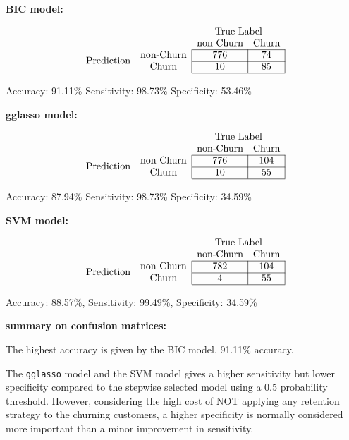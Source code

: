 \documentclass[11pt]{article}
\begin{document}
\textbf{BIC model: }

$$
\begin{array}{cc|c|c|}
& \multicolumn{1}{c}{} & \multicolumn{2}{c}{\text{True Label}} \\
& \multicolumn{1}{c}{} & \multicolumn{1}{c}{\text{non-Churn}} & \multicolumn{1}{c}{\text{Churn}} \\ \cline{3-4}
\multirow{2}{*}{\text{Prediction}} & \text{non-Churn} & 776 & 74 \\ \cline{3-4}
& \text{Churn} & 10 & 85 \\ \cline{3-4} 
\end{array}
$$

Accuracy: 91.11\%
Sensitivity: 98.73\%          
Specificity: 53.46\% 

\textbf{gglasso model:}

$$
\begin{array}{cc|c|c|}
& \multicolumn{1}{c}{} & \multicolumn{2}{c}{\text{True Label}} \\
& \multicolumn{1}{c}{} & \multicolumn{1}{c}{\text{non-Churn}} & \multicolumn{1}{c}{\text{Churn}} \\ \cline{3-4}
\multirow{2}{*}{\text{Prediction}} & \text{non-Churn} & 776 & 104 \\ \cline{3-4}
& \text{Churn} & 10 & 55 \\ \cline{3-4} 
\end{array}
$$

Accuracy: 87.94\%
Sensitivity: 98.73\%         
Specificity: 34.59\%

\textbf{SVM model: }

$$
\begin{array}{cc|c|c|}
& \multicolumn{1}{c}{} & \multicolumn{2}{c}{\text{True Label}} \\
& \multicolumn{1}{c}{} & \multicolumn{1}{c}{\text{non-Churn}} & \multicolumn{1}{c}{\text{Churn}} \\ \cline{3-4}
\multirow{2}{*}{\text{Prediction}} & \text{non-Churn} & 782 & 104 \\ \cline{3-4}
& \text{Churn} & 4 & 55 \\ \cline{3-4} 
\end{array}
$$

Accuracy: 88.57\%,
Sensitivity: 99.49\%,    
Specificity: 34.59\%

\textbf{summary on confusion matrices: }

The highest accuracy is given by the BIC model, 91.11\% accuracy. 

The \texttt{gglasso} model and the SVM model gives a higher sensitivity but lower specificity compared to the stepwise selected model using a 0.5 probability threshold. However, considering the high cost of NOT applying any retention strategy to the churning customers, a higher specificity is normally considered more important than a minor improvement in sensitivity. 
\end{document}
